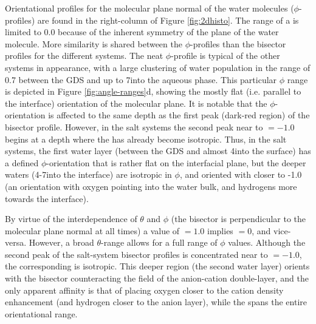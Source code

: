 Orientational profiles for the molecular plane normal of the water molecules ($\phi$-profiles) are found in the right-column of Figure \ref{fig:2dhisto}. The range of a \phiprof is limited to 0.0 because of the inherent symmetry of the plane of the water molecule. More similarity is shared between the $\phi$-profiles than the bisector profiles for the different systems. The neat \ctcwat $\phi$-profile is typical of the other systems in appearance, with a large clustering of water population in the range of 0.7 between the GDS and up to 7\angs into the aqueous phase. This particular $\phi$ range is depicted in Figure \ref{fig:angle-ranges}d, showing the mostly flat (i.e. parallel to the interface) orientation of the molecular plane. It is notable that the $\phi$-orientation is affected to the same depth as the first peak (dark-red region) of the bisector profile. However, in the salt systems the second peak near to \costheta$=-1.0$ begins at a depth where the \phiprof has already become isotropic. Thus, in the salt systems, the first water layer (between the GDS and almost 4\angs into the surface) has a defined $\phi$-orientation that is rather flat on the interfacial plane, but the deeper waters (4-7\angs into the interface) are isotropic in $\phi$, and oriented with \costheta closer to -1.0 (an orientation with oxygen pointing into the water bulk, and hydrogens more towards the interface).

By virtue of the interdependence of $\theta$ and $\phi$ (the bisector is perpendicular to the molecular plane normal at all times) a value of \cosphi$=1.0$ implies \costheta$=0$, and vice-versa. However, a broad $\theta$-range allows for a full range of $\phi$ values. Although the second peak of the salt-system bisector profiles is concentrated near to \costheta$=-1.0$, the corresponding \phiprof is isotropic. This deeper region (the second water layer) orients with the bisector counteracting the field of the anion-cation double-layer, and the only apparent affinity is that of placing oxygen closer to the cation density enhancement (and hydrogen closer to the anion layer), while the \phiprof spans the entire orientational range.

